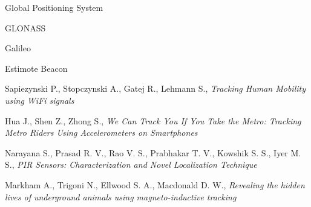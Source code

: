 \begin{thebibliography}{99}
  Global Positioning System
  
  GLONASS

  Galileo

  
  Estimote Beacon
  
   Sapiezynski P., Stopczynski A., Gatej R., Lehmann S.,
  \textit{Tracking Human Mobility using WiFi signals} 
  
   Hua J., Shen Z., Zhong S., 
  \textit{We Can Track You If You Take the Metro: Tracking Metro Riders Using Accelerometers on Smartphones}
  
   Narayana S., Prasad R. V., Rao V. S., Prabhakar  T. V., Kowshik S. S., Iyer M. S.,
  \textit{PIR Sensors: Characterization and Novel Localization Technique}
  
   Markham A., Trigoni N., Ellwood S. A., Macdonald D. W.,
  \textit{Revealing the hidden lives of underground animals using magneto-inductive tracking}

  
\end{thebibliography}
